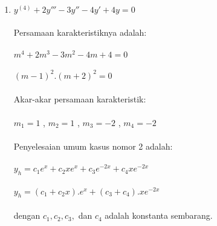 \begin{enumerate}[1.]
	\item \begin{math} y^{(4)} + 2y''' - 3y'' - 4y' + 4y = 0 \end{math} \\ \\
	Persamaan karakteristiknya adalah: \\ \\
	\begin{math} m^{4} + 2m^{3} - 3m^{2} - 4m + 4 = 0 \end{math} \\ \\
	\begin{math} (m - 1)^{2} . (m + 2)^{2} = 0 \end{math} \\ \\
	Akar-akar persamaan karakteristik: \\ \\
	\begin{math} m_1 = 1 \end{math} , \begin{math} m_2 = 1 \end{math} , \begin{math} m_3 = -2 \end{math} , \begin{math} m_4 = -2 \end{math} \\ \\
	Penyelesaian umum kasus nomor 2 adalah: \\ \\
	\begin{math} y_h = c_1 e^{x} + c_2 xe^{x} + c_3 e^{-2x} + c_4 xe^{-2x} \end{math} \\ \\
	\begin{math} y_h = (c_1 + c_2 x) .  e^{x} + (c_3+ c_4) . xe^{-2x} \end{math} \\ \\
	dengan \begin{math} c_1, c_2, c_3, \end{math} dan \begin{math} c_4 \end{math} adalah konstanta sembarang.


\end{enumerate}
